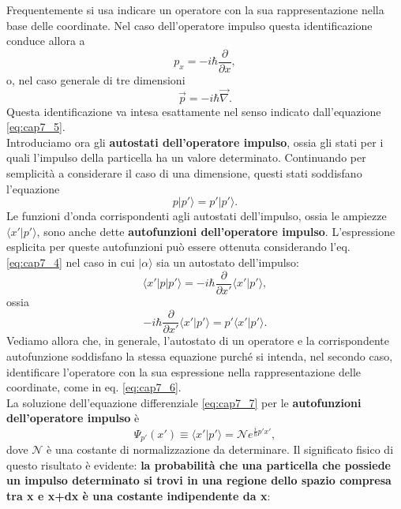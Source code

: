 Frequentemente si usa indicare un operatore con la sua rappresentazione nella base delle coordinate. Nel caso dell'operatore impulso questa identificazione conduce allora a
\begin{equation}
\label{eq:cap7_6}
p_x= -i\hbar \frac{\partial}{\partial x} ,
\end{equation}
o, nel caso generale di tre dimensioni
\begin{equation}
\vec{p}= -i\hbar \vec{\nabla}.
\end{equation}
Questa identificazione va intesa esattamente nel senso indicato dall'equazione \eqref{eq:cap7_5}.\\
Introduciamo ora gli \textbf{autostati dell'operatore impulso}, ossia gli stati per i quali l'impulso della particella ha un valore determinato. Continuando per semplicità a considerare il caso di una dimensione, questi stati soddisfano l'equazione
\begin{equation}
p | p' \rangle = p' | p' \rangle.
\end{equation}
Le funzioni d'onda corrispondenti agli autostati dell'impulso, ossia le ampiezze $\langle x' | p' \rangle$, sono anche dette \textbf{autofunzioni dell'operatore impulso}. L'espressione esplicita per queste autofunzioni può essere ottenuta considerando l'eq. \eqref{eq:cap7_4} nel caso in cui $| \alpha \rangle$ sia un autostato dell'impulso:
\begin{equation}
\langle x' | p | p' \rangle = -i \hbar \frac{\partial}{\partial x'} \langle x' | p' \rangle,
\end{equation}
\noindent ossia
\begin{equation}
\label{eq:cap7_7}
-i \hbar \frac{\partial}{\partial x'} \langle x' | p' \rangle = p' \langle x' | p' \rangle.
\end{equation}
Vediamo allora che, in generale, l'autostato di un operatore e la corrispondente autofunzione soddisfano la stessa equazione purché si intenda, nel secondo caso, identificare l'operatore con la sua espressione nella rappresentazione delle coordinate, come in eq. \eqref{eq:cap7_6}.\\
La soluzione dell'equazione differenziale \eqref{eq:cap7_7} per le \textbf{autofunzioni dell'operatore impulso} è
\begin{equation}
\label{eq:cap7_8}
\Psi_{p'}(x') \equiv \langle x' | p' \rangle = \mathcal{N} e^{\frac{i}{\hbar}p'x'},
\end{equation}
dove $\mathcal{N}$ è una costante di normalizzazione da determinare. Il significato fisico di questo risultato è evidente: \textbf{la probabilità che una particella che possiede un impulso determinato si trovi in una regione dello spazio compresa tra x e x+dx è una costante indipendente da x}:
